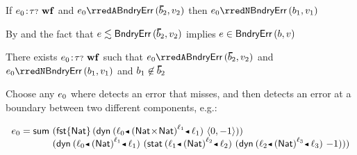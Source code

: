 \begin{flushleft}
{\begin{mathpar}

\end{mathpar}}

\end{flushleft}

\vfill
\newpage

\begin{corollary}
  If\/ $\fwellformed{\sexpr_0}{\stoptional}$
  and\/ $\sexpr_0 \rredA \boundaryerror{\sblist_2}{\svalue_2}$
  then\/ $\sexpr_0 \rredN \boundaryerror{\sbnd_1}{\svalue_1}$
\end{corollary}
\begin{lamportproof}
  By 
  and the fact that $\rexpr{\sexpr}{\boundaryerror{\sblist_2}{\svalue_2}}$ implies $\sexpr \in \boundaryerror{\sbnd}{\svalue}$
\end{lamportproof}

\begin{example}
  There exists\/ $\fwellformed{\sexpr_0}{\stoptional}$
  such that\/ $\sexpr_0 \rredA \boundaryerror{\sblist_2}{\svalue_2}$
  and\/ $\sexpr_0 \rredN \boundaryerror{\sbnd_1}{\svalue_1}$
  and\/ $\sbnd_1 \not\in \sblist_2$
\end{example}
\begin{lamportproof}
  Choose any $\sexpr_0$ where \Nname{} detects an error that \Aname{} misses,
   and then \Aname{} detects an error at a boundary between two different
   components, e.g.:

  \(\begin{array}{l@{~}l}
    \sexpr_0 \eeq \ssum & {(\efst{\tnat}{(\edynb{\obnd{\sowner_0}{\obars{\tpair{\tnat}{\tnat}}{\sowner_1}}{\sowner_1}}{\epair{0}{{-1}}})})}
    \\                  & {(\edynb{\obnd{\sowner_0}{\obars{\tnat}{\sowner_1}}{\sowner_1}}{(\estab{\obnd{\sowner_1}{\obars{\tnat}{\sowner_2}}{\sowner_2}}{(\edynb{\obnd{\sowner_2}{\obars{\tnat}{\sowner_3}}{\sowner_3}}{{-1}})})})}
  \end{array}\)
\end{lamportproof}

